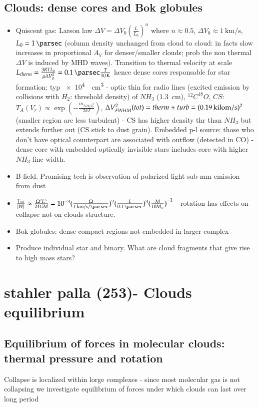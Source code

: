 \documentclass[main.tex]{subfiles}
\begin{document}
\section{Clouds: dense cores and Bok globules}
\begin{itemize}
\item Quiscent gas: Larson law $\Delta V=\Delta V_0(\frac{L}{L_0})^n$ where $n\approx0.5$, $\Delta V_0\approx\SI{1}{\kilo\meter\per\second}$, $L_0=\SI{1}{\parsec}$ (column density unchanged from cloud to cloud: in facts slow increases in proportional $A_V$ for denser/smaller clouds; prob the non thermal $\Delta V$ is induced by MHD waves). Transition to thermal velocity at scale $L_{therm}=\frac{3RTL_0}{\mu\Delta V_0^2}=\SI{0.1}{\parsec}\frac{T}{\SI{10}{\kelvin}}$ hence dense cores responsable for star formation: typ \SI{e4}{\per\cubic\cm} - optic thin for radio lines (excited emission by collisions with $H_2$: threshold density) of $NH_3$ (\SI{1.3}{\cm}), $^{12}C^{18}O$, $CS$: $T_A(V_r)\propto\exp{(-\frac{m_{NH_3V_r^2}}{2kT})}$, $\Delta V_{FWHM}^2(tot)=therm+turb=(\SI{0.19}{\\kilo\meter\per\second})^2$ (smaller region are less turbulent) - CS has higher density thr than $NH_3$ but extends further out (CS stick to dust grain). Embedded p-l source: those who don't have optical counterpart are associated with outflow (detected in CO) - dense core with embedded optically invisible stars includes core with higher $NH_3$ line width.
\item B-field. Promising tech is observation of polarized light sub-mm emission from dust
\item $\frac{T_{rot}}{|W|}\approx\frac{\Omega^2 L^3}{24GM}=\num{e-3}(\frac{\Omega}{\SI{1}{\kilo\meter\per\second\per\parsec}})^2(\frac{L}{\SI{0.1}{\parsec}})^3\invers{(\frac{M}{10\msun})}$ - rotation has effects on collapse not on clouds structure.
\item Bok globules: dense compact regions not embedded in larger complex
\item Produce individual star and binary. What are cloud fragments that give rise to high mass stars?
\end{itemize}

\chapter{stahler palla (253)- Clouds equilibrium}

\section{Equilibrium of forces in molecular clouds: thermal pressure and rotation}
Collapse is localized within lorge complexes - since most molecular gas is not collapsing we investigate equilibrium of forces under which clouds can last over long period
\end{document}
